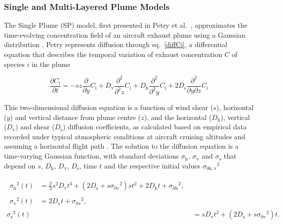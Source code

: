 \subsubsection{Single and Multi-Layered Plume Models}
The Single Plume (SP) model, first presented in Petry et al.\ \cite{Petry1998}, approximates the time-evolving concentration field of an aircraft exhaust plume using a Gaussian distribution \cite{Vohralik2008}. Petry represents diffusion through eq.\ \eqref{diffCi}, a differential equation that describes the temporal variation of exhaust concentration $C$ of species $i$ in the plume

\begin{equation}
	\frac{\partial C_{\mathrm{i}}}{\partial t} = -sz \frac{\partial}{\partial y} C_{\mathrm{i}} + D_{\mathrm{v}} \frac{\partial^2}{\partial^2 z} C_{\mathrm{i}} + D_{\mathrm{h}} \frac{\partial^2}{\partial^2 y} C_{\mathrm{i}} + 2D_{\mathrm{s}} \frac{\partial^2}{\partial y \partial z} C_{\mathrm{i}}
	\label{diffCi}
\end{equation}

This two-dimensional diffusion equation is a function of wind shear ($s$), horizontal ($y$) and vertical distance from plume centre ($z$), and the horizontal ($D_{\mathrm{h}}$), vertical ($D_{\mathrm{v}}$) and shear ($D_{\mathrm{s}}$) diffusion coefficients, as calculated based on empirical data recorded under typical atmospheric conditions at aircraft cruising altitudes and assuming a horizontal flight path \cite{Durbeck1995}. The solution to the diffusion equation is a time-varying Gaussian function, with standard deviations $\sigma_{\mathrm{h}}$, $\sigma_{\mathrm{v}}$ and $\sigma_{\mathrm{s}}$ that depend on $s$, $D_{\mathrm{h}}$, $D_{\mathrm{v}}$, $D_{\mathrm{s}}$, time $t$ and the respective initial values ${\sigma_{\mathrm{0h, v}}}^2$


\begin{align}
\begin{split}
	{\sigma_{\mathrm{h}}}^{2}(t) {}&= \frac{2}{3} s^2 D_{\mathrm{v}} t^3 + (2 D_{\mathrm{s}} + s {\sigma_{\mathrm{0v}}}^2) s t^2 + 2 D_{\mathrm{h}} t + {\sigma_{\mathrm{0h}}}^2,
\end{split} \\
\begin{split}
	{\sigma_{\mathrm{v}}}^{2}(t) {}&= 2 D_{\mathrm{v}} t + {\sigma_{\mathrm{0v}}}^2,
	\end{split}\\
	{\sigma_{\mathrm{s}}}^{2}(t) {}&= s D_{\mathrm{v}} t^2 + (2 D_{\mathrm{s}} + s {\sigma_{\mathrm{0v}}}^2) t.
\end{align}

